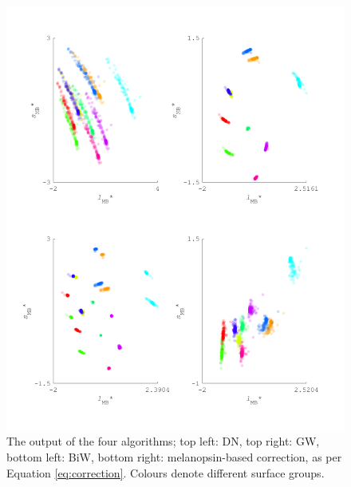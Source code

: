 \begin{figure}[htbp]
\includegraphics[max width=1.2\textwidth, center]{figs/comp/comparisonFourAlgos/output100.pdf}
 \caption{The output of the four algorithms; top left: \gls{DN}, top right: \gls{GW}, bottom left: \gls{BiW}, bottom right: melanopsin-based correction, as per Equation \ref{eq:correction}. Colours denote different surface groups.}
 \label{fig:output100}
\end{figure} 

